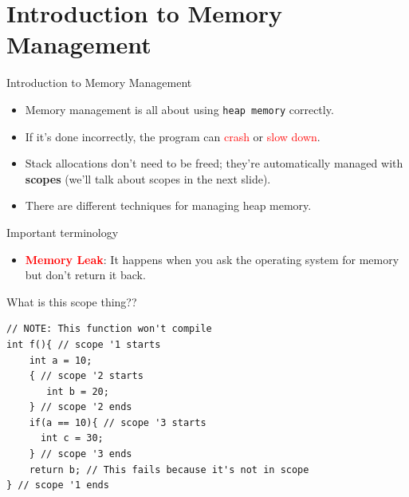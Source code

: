 \documentclass[
  10pt,
  ignorenonframetext,
]{beamer}
\providecommand{\tightlist}{%
  \setlength{\itemsep}{0pt}\setlength{\parskip}{0pt}}
\begin{document}
\hypertarget{introduction-to-memory-management}{%
\section{Introduction to Memory
Management}\label{introduction-to-memory-management}}

\begin{frame}{Introduction to Memory Management}
\begin{itemize}
\tightlist
\item
  Memory management is all about using
  \texttt{heap memory} correctly.
\end{itemize}

\pause

\begin{itemize}
\tightlist
\item
  If it's done incorrectly, the program can
  \textcolor{red}{crash } or
  \textcolor{red}{slow down}.
\end{itemize}

\pause

\begin{itemize}
\tightlist
\item
  Stack allocations don't need to be freed;
  they're automatically managed with
  \textbf{scopes} (we'll talk about scopes in the
  next slide).
\end{itemize}

\pause

\begin{itemize}
\tightlist
\item
  There are different techniques for managing heap
  memory.
\end{itemize}

\begin{block}{Important terminology}
\protect\hypertarget{important-terminology}{}
\begin{itemize}
\tightlist
\item
  \textbf{\textcolor{red}{Memory Leak}}: It
  happens when you ask the operating system for
  memory but don't return it back.
\end{itemize}
\end{block}
\end{frame}

\begin{frame}[fragile]{What is this scope thing??}
\protect\hypertarget{what-is-this-scope-thing}{}
\scriptsize

\begin{verbatim}
// NOTE: This function won't compile
int f(){ // scope '1 starts
    int a = 10;
    { // scope '2 starts
       int b = 20;
    } // scope '2 ends
    if(a == 10){ // scope '3 starts
      int c = 30;
    } // scope '3 ends
    return b; // This fails because it's not in scope
} // scope '1 ends
\end{verbatim}

\normalsize
\end{frame}
\end{document}
